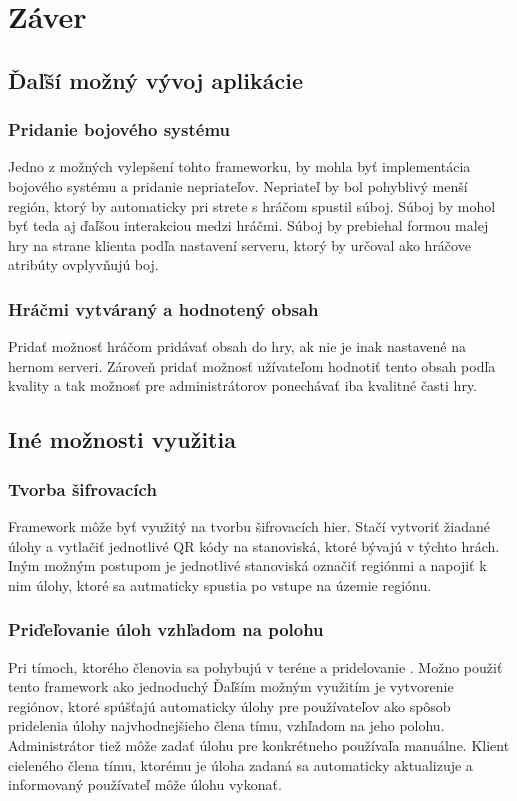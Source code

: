 \chapter{Záver}
\section{Ďaľší možný vývoj aplikácie}
\subsection{Pridanie bojového systému}
Jedno z možných vylepšení tohto frameworku, by mohla byť implementácia bojového systému a pridanie nepriateľov. Nepriateľ by bol pohyblivý menší región, ktorý by automaticky pri strete s hráčom spustil súboj. Súboj by mohol byť teda aj ďaľšou interakciou medzi hráčmi. Súboj by prebiehal formou malej hry na strane klienta podľa nastavení serveru, ktorý by určoval ako hráčove atribúty ovplyvňujú boj. 

\subsection{Hráčmi vytváraný a hodnotený obsah}
Pridať možnosť hráčom pridávať obsah do hry, ak nie je inak nastavené na hernom serveri. Zároveň pridať možnosť užívateľom hodnotiť tento obsah podľa kvality a tak možnosť pre administrátorov ponechávať iba kvalitné časti hry.

\section{Iné možnosti využitia}
\subsection{Tvorba šifrovacích }
Framework môže byť využitý na tvorbu šifrovacích hier. Stačí vytvoriť žiadané úlohy a vytlačiť jednotlivé QR kódy na stanoviská, ktoré bývajú v týchto hrách. Iným možným postupom je jednotlivé stanoviská označiť regiónmi a napojiť k nim úlohy, ktoré sa autmaticky spustia po vstupe na územie regiónu.

\subsection{Priďeľovanie úloh vzhľadom na polohu}
Pri tímoch, ktorého členovia sa pohybujú v teréne a pridelovanie . Možno použiť tento framework ako jednoduchý 
Ďaľším možným využitím je vytvorenie regiónov, ktoré spúšťajú automaticky úlohy pre používateľov ako spôsob pridelenia úlohy najvhodnejšieho člena tímu, vzhľadom na jeho polohu. Administrátor tiež môže zadať úlohu pre konkrétneho používaľa manuálne. Klient cieleného člena tímu, ktorému je úloha zadaná sa automaticky aktualizuje a informovaný používateľ môže úlohu vykonať.


